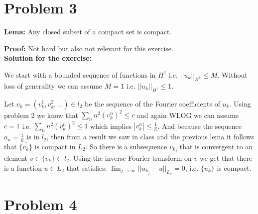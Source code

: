 \documentclass{article}
\begin{document}
\section{Problem 3}
\textbf{Lema:} Any closed subset of a compact set is compact.

\textbf{Proof:} Not hard but also not relevant for this exercise.\\
\textbf{Solution for the exercise:}

We start with a bounded sequence of functions in $H^1$ i.e. $||u_k||_{H^1}\leq M$.
Without loss of generality we can assume $M=1$ i.e. $||u_k||_{H^1}\leq 1$.

Let $v_k=(v_k^1,v_k^2,\dots)\in l_2$ be the sequence of the Fourier coefficients of $u_k$.
Using problem 2 we know that $\sum_nn^2(v_k^n)^2\leq c$ and again WLOG we can
assume $c=1$ i.e. $\sum_nn^2(v_k^n)^2\leq 1$ which implies $|v_k^n|\leq
\frac{1}{n}$. And because the sequence $a_n=\frac{1}{n}$ is in $l_2$, then from
a result we saw in class and the previous lema it follows that
$\overline{\{v_k\}}$ is compact in $L_2$. So there is a subsequence $v_{k_j}$
that is convergent to an element $v\in \overline{\{v_k\}}\subset l_2$. Using
the inverse Fourier transform on $v$ we get that there is a function $u\in L_2$
that satisfies: $\lim_{j\to\infty}||u_{k_j}-u||_{L_2}=0$, i.e.
$\overline{\{u_k\}}$ is compact.
\section{Problem 4}
\end{document}
